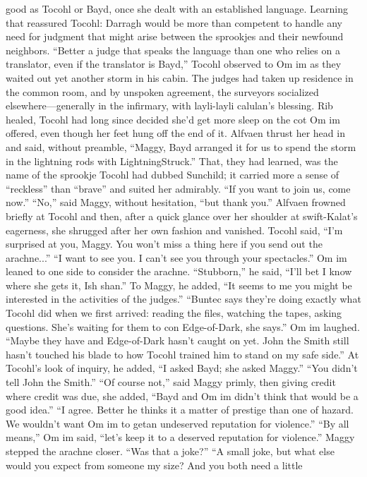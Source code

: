 \documentclass[9pt]{article}
\begin{document}
good as Tocohl or Bayd, once she dealt with an established language. Learning that reassured Tocohl:
Darragh would be more than competent to handle any need for judgment that might arise between the
sprookjes and their newfound neighbors.
“Better a judge that speaks the language than one who relies on a translator, even if the translator is
Bayd,” Tocohl observed to Om im as they waited out yet another storm in his cabin.
The judges had taken up residence in the common room, and by unspoken agreement, the surveyors
socialized elsewhere—generally in the infirmary, with layli-layli calulan’s blessing. Rib healed, Tocohl
had long since decided she’d get more sleep on the cot Om im offered, even though her feet hung off the
end of it.
Alfvaen thrust her head in and said, without preamble, “Maggy, Bayd arranged it for us to spend the
storm in the lightning rods with LightningStruck.” That, they had learned, was the name of the sprookje
Tocohl had dubbed Sunchild; it carried more a sense of “reckless” than “brave” and suited her
admirably. “If you want to join us, come now.”
“No,” said Maggy, without hesitation, “but thank you.”
Alfvaen frowned briefly at Tocohl and then, after a quick glance over her shoulder at swift-Kalat’s
eagerness, she shrugged after her own fashion and vanished.
Tocohl said, “I’m surprised at you, Maggy. You won’t miss a thing here if you send out the
arachne...”
“I want to see you. I can’t see you through your spectacles.”
Om im leaned to one side to consider the arachne. “Stubborn,” he said, “I’ll bet I know where she
gets it, Ish shan.” To Maggy, he added, “It seems to me you might be interested in the activities of the
judges.”
“Buntec says they’re doing exactly what Tocohl did when we first arrived: reading the files, watching
the tapes, asking questions. She’s waiting for them to con Edge-of-Dark, she says.”
Om im laughed. “Maybe they have and Edge-of-Dark hasn’t caught on yet. John the Smith still
hasn’t touched his blade to how Tocohl trained him to stand on my safe side.” At Tocohl’s look of
inquiry, he added, “I asked Bayd; she asked Maggy.”
“You didn’t tell John the Smith.”
“Of course not,” said Maggy primly, then giving credit where credit was due, she added, “Bayd and
Om im didn’t think that would be a good idea.”
“I agree. Better he thinks it a matter of prestige than one of hazard. We wouldn’t want Om im to getan undeserved reputation for violence.”
“By all means,” Om im said, “let’s keep it to a deserved reputation for violence.”
Maggy stepped the arachne closer. “Was that a joke?”
“A small joke, but what else would you expect from someone my size? And you both need a little
\end{document}
